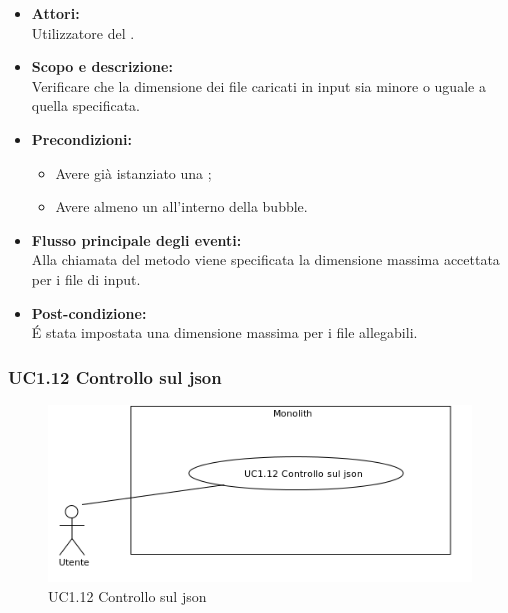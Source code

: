 \begin{itemize}
	\item \textbf{Attori:}
	\\Utilizzatore del .
	\item \textbf{Scopo e descrizione:} 
	\\Verificare che la dimensione dei file caricati in input sia minore o uguale a quella specificata.
	\item \textbf{Precondizioni:}
	\begin{itemize}
		\item Avere già istanziato una ;
		\item Avere almeno un  all'interno della bubble.
	\end{itemize}
	\item \textbf{Flusso principale degli eventi:}
	\\Alla chiamata del metodo viene specificata la dimensione massima accettata per i file di input.
	\item \textbf{Post-condizione:}
	\\É stata impostata una dimensione massima per i file allegabili.
\end{itemize}

\subsubsection{UC1.12 Controllo sul json} \label{UC1.12}

\begin{figure}[H]
	\centering
	\includegraphics[width=15cm]{../../documenti/AnalisiDeiRequisiti/Diagrammi_img/uc1_12.png}
	\caption{UC1.12 Controllo sul json}
\end{figure}

